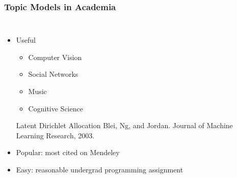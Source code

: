 \documentclass[compress]{beamer}
\begin{document}
\begin{frame}
\frametitle{Topic Models in Academia}

\begin{columns}


\begin{itemize}
  \item Useful
    \begin{itemize}
      \item Computer Vision \cite{feifei-05}
      \item Social Networks \cite{airoldi-08}
      \item Music \cite{hu-09}
      \item Cognitive Science \cite{griffiths-06}
    \end{itemize}

\begin{block}{Latent Dirichlet Allocation}
Blei, Ng, and Jordan.  Journal of Machine Learning Research, 2003.
\end{block}


  \item Popular: most cited on Mendeley
  \item Easy: reasonable undergrad programming assignment
\end{itemize}



\end{columns}
\end{frame}
\end{document}
